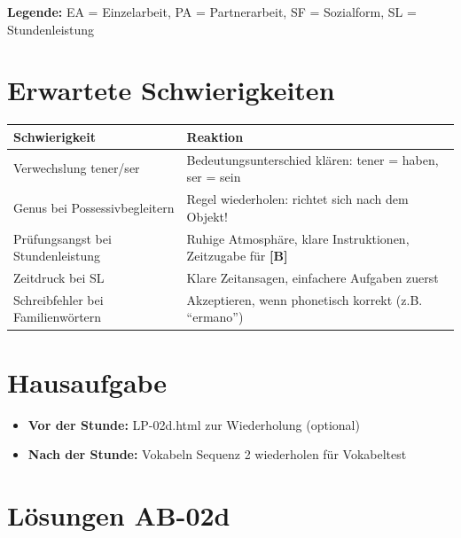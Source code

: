 \documentclass[11pt,a4paper]{article}
\newcommand{\B}{\textcolor{basis}{\textbf{[B]}}}
\begin{document}
\textbf{Legende:} EA = Einzelarbeit, PA = Partnerarbeit, SF = Sozialform, SL = Stundenleistung

\section{Erwartete Schwierigkeiten}

\begin{tabular}{|p{5cm}|p{8cm}|}
\hline
\textbf{Schwierigkeit} & \textbf{Reaktion} \\
\hline
Verwechslung tener/ser & Bedeutungsunterschied klären: tener = haben, ser = sein \\
\hline
Genus bei Possessivbegleitern & Regel wiederholen: richtet sich nach dem Objekt! \\
\hline
Prüfungsangst bei Stundenleistung & Ruhige Atmosphäre, klare Instruktionen, Zeitzugabe für \B{} \\
\hline
Zeitdruck bei SL & Klare Zeitansagen, einfachere Aufgaben zuerst \\
\hline
Schreibfehler bei Familienwörtern & Akzeptieren, wenn phonetisch korrekt (z.B. ``ermano'') \\
\hline
\end{tabular}

\section{Hausaufgabe}

\begin{itemize}
    \item \textbf{Vor der Stunde:} LP-02d.html zur Wiederholung (optional)
    \item \textbf{Nach der Stunde:} Vokabeln Sequenz 2 wiederholen für Vokabeltest
\end{itemize}

\section{Lösungen AB-02d}
\end{document}
